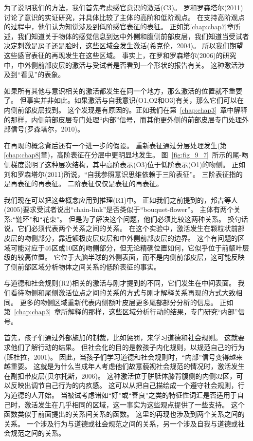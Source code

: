 为了说明我们的方法，我们首先考虑感官意识的激活(C3)。
罗和罗森塔尔(2011)讨论了意识的实证研究，并具体比较了主体的高阶和低阶观点。
在支持高阶观点的过程中，他们认为知觉涉及到低阶感官表征的表征。
正如第\ref{chap:chap7}章所述，我们知道关于物体的感觉信息到达中外侧和腹侧前部皮层，我们知道当受试者决定刺激是房子还是脸时，这些区域会发生激活(希克伦，2004)。
所以我们期望这些感官表征的再现发生在这些区域。
事实上，在罗和罗森塔尔(2006)的研究中，中外侧前部皮层的激活与受试者是否看到一个形状的报告有关。
这种激活涉及到“看见”的表象。



如果所有其他与意识相关的激活都发生在同一个地方，那么激活的位置就不重要了。
但事实并非如此。如果激活与自我意识(O1,O2和O3)有关，那么它们可以在内侧前部皮层找到。
这个发现是有原因的。正如我们在第~\ref{chap:chap3}~章中解释的那样，内侧前部皮层专门处理“内部”信号，而其他更外侧的前部皮层专门处理外部信号(罗森塔尔，2010)。


在再现的概念背后还有一个进一步的假设。
重新表征通过分层处理发生(第\ref{chap:chap8}章)，高阶表征在分层中更明显地发生。
图~\ref{fig:fig_9_7}~所示的尾-吻侧梯度说明了这种层次结构，其中高阶表示(O3)位于低阶表示(O1)的吻侧。
正如刘和罗森塔尔(2011)所说，“自我参照意识思维依赖于三阶表征”。
三阶表征指的是再表征的再表征。
二阶表征仅仅是表征的再表征。


我们现在可以把这些概念应用到推理(R1)中。
正如我们之前提到的，邦吉等人(2005)要求受试者说出“chain-link”是否类似于“bouquet-flower”。
主体有两个关系:“链环”和“花束”。
但是为了解决这个问题，他们必须比较这两种关系。
换句话说，它们必须代表两个关系之间的关系。
在这个实验中，激活发生在颗粒状前部皮层的吻侧部分，靠近额极皮层皮层和中外侧前部皮层的边界。
这个有问题的区域可能对应于46区或10区的吻侧部分，但无论精确位置如何，它似乎位于前额叶层级的较高位置。
它位于大脑半球的外侧表面，而不是内侧前部皮层，这可能反映了侧前部区域分析物体之间关系的低阶表征的事实。


与道德和社会规则(R2)相关的激活与刚才提到的不同，它们发生在中间表面。
我们看待吻侧和尾侧激活位点之间的关系的方式与刚才解释关系再现的方式大致相同。
更多的吻侧区域重新代表内侧额叶皮层更多尾部部分分析的信息。
正如第~\ref{chap:chap3}~章所解释的那样，这些区域分析行动的结果，专门研究“内部”信号。


首先，孩子们通过外部施加的制裁，比如惩罚，来学习道德和社会规则。
这就要求他们了解行动的结果。
但社会化的目的是教孩子内化规则，以规范自己的行为(班杜拉，2001)。
因此，当孩子们学习道德和社会规则时，“内部”信号变得越来越重要。
这就是为什么当成年人考虑他们故意藐视社会规范的情况时，激活发生在副扣带皮层(贝尔托斯，2006)。
这种激活位于胼胝体膝背腹侧的内侧32区，可以反映出调节自己行为的内疚感。
这可以从把自己描绘成一个遵守社会规则，行为道德的人开始。
当被试考虑诸如“好”或“善良”之类的特征性词汇是否适用于自己时，激活发生在几乎相同的区域，这一事实为这些观点提供了一些支持。
这个函数类似于前面提出的关系间关系的函数。
这里的再现也涉及到两个关系之间的关系。
一个涉及行为与道德或社会规范之间的关系，另一个涉及自我与道德或社会规范之间的关系。


